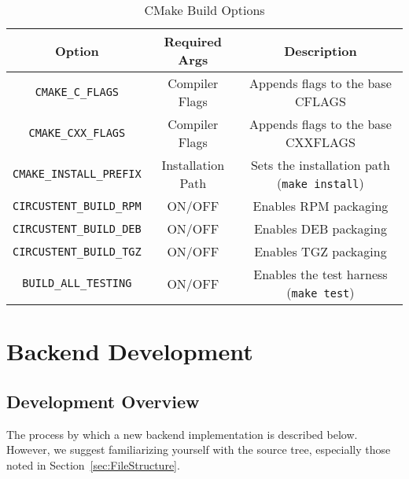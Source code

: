 \documentclass{article}
\begin{document}
\begin{table}[!h]
\renewcommand{\arraystretch}{1.3}
\caption{CMake Build Options}
\label{tab:cmakeoptions}
\centering
\begin{tabular}{c|c|c}
\hline
\textbf{Option} & \textbf{Required Args} & \textbf{Description}\\
\hline
\texttt{CMAKE\_C\_FLAGS} & Compiler Flags & Appends flags to the base CFLAGS\\
\hline
\texttt{CMAKE\_CXX\_FLAGS} & Compiler Flags & Appends flags to the base CXXFLAGS\\
\hline
\texttt{CMAKE\_INSTALL\_PREFIX} & Installation Path & Sets the installation path (\texttt{make install})\\
\hline
\texttt{CIRCUSTENT\_BUILD\_RPM} & ON/OFF & Enables RPM packaging\\
\hline
\texttt{CIRCUSTENT\_BUILD\_DEB} & ON/OFF &  Enables DEB packaging\\
\hline
\texttt{CIRCUSTENT\_BUILD\_TGZ} & ON/OFF & Enables TGZ packaging\\
\hline
\texttt{BUILD\_ALL\_TESTING} & ON/OFF & Enables the test harness (\texttt{make test})\\
\hline
\end{tabular}
\end{table}

\clearpage
\section{Backend Development}
\label{sec:BackendDev}

\subsection{Development Overview}
\label{sec:DevelopmentOverview}

The process by which a new backend implementation is described below.  However, 
we suggest familiarizing yourself with the source tree, especially those noted in 
Section~\ref{sec:FileStructure}.  
\end{document}

